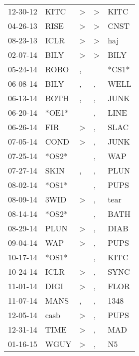 \begin{supertabular}{lllll}
 12-30-12 &   KITC &     \textgreater &  \textgreater &   KITC \\
 04-26-13 &   RISE &     \textgreater &  \textgreater &   CNST \\
 08-23-13 &   ICLR &     \textgreater &  \textgreater &    haj \\
 02-07-14 &   BILY &     \textgreater &  \textgreater &   BILY \\
 05-24-14 &   ROBO &                , &               &  *CS1* \\
 06-08-14 &   BILY &                , &             , &   WELL \\
 06-13-14 &   BOTH &                , &             , &   JUNK \\
 06-20-14 &  *OE1* &                  &             , &   LINE \\
 06-26-14 &    FIR &     \textgreater &             , &   SLAC \\
 07-05-14 &   COND &     \textgreater &             , &   JUNK \\
 07-25-14 &  *OS2* &                  &             , &    WAP \\
 07-27-14 &   SKIN &                , &             , &   PLUN \\
 08-02-14 &  *OS1* &                  &             , &   PUPS \\
 08-09-14 &   3WID &     \textgreater &             , &   tear \\
 08-14-14 &  *OS2* &                  &             , &   BATH \\
 08-29-14 &   PLUN &     \textgreater &             , &   DIAB \\
 09-04-14 &    WAP &     \textgreater &             , &   PUPS \\
 10-17-14 &  *OS1* &                  &             , &   KITC \\
 10-24-14 &   ICLR &     \textgreater &             , &   SYNC \\
 11-01-14 &   DIGI &     \textgreater &             , &   FLOR \\
 11-07-14 &   MANS &                , &             , &   1348 \\
 12-05-14 &   casb &     \textgreater &             , &   PUPS \\
 12-31-14 &   TIME &     \textgreater &             , &    MAD \\
 01-16-15 &   WGUY &     \textgreater &             , &     N5 \\

\end{supertabular}
